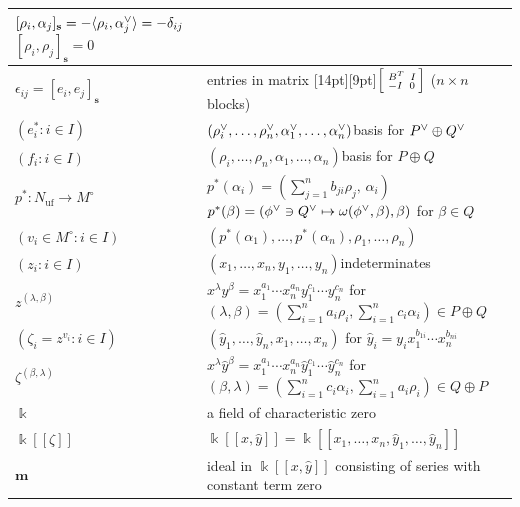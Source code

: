 \documentclass[ALCO,ThmDefs,Unicode,epreuves]{cedram}
\DeclareMathOperator{\uf}{uf}
\newcommand\llbracket{[\![}
\newcommand\rrbracket{]\!]}
\newcommand{\br}[1]{{\langle #1 \rangle}}
\newcommand{\ck}{\spcheck}
\newcommand{\s}{\mathbf{s}}
\newcommand{\m}{\mathbf{m}}
\renewcommand{\k}{\Bbbk}
\newcommand{\hy}{\hat{y}}
\begin{document}
{\begin{longtable}{P{88pt}|P{242pt}}
$[\rho_i,\alpha_j]_\s=-\br{\rho_i,\alpha_j\ck}=-\delta_{ij}$ \newline
$[\rho_i,\rho_j]_\s=0$
\\\hline
$\epsilon_{ij}=[e_i,e_j]_\s$&entries in matrix \raisebox{0pt}[14pt][9pt]{$\begin{bsmallmatrix}\,B^T&\,I\\-I&0\end{bsmallmatrix}$} ($n\times n$ blocks)\\\hline
$(e^*_i:i\in I)$&$(\rho_i\ck,\ldots,\rho_n\ck,\alpha_1\ck,\ldots,\alpha_n\ck)$\quad basis for $P\ck\oplus Q\ck$\\\hline
$(f_i:i\in I)$&$(\rho_i,\ldots,\rho_n,\alpha_1,\ldots,\alpha_n)$\quad basis for $P\oplus Q$\\\hline
$p^*:N_{\uf}\to M^\circ$&$p^*(\alpha_i)=(\sum_{j=1}^nb_{ji}\rho_j,\,\alpha_i)$ %
\newline
$p^*(\beta)=(\phi\ck\ni Q\ck\mapsto\omega(\phi\ck,\beta),\beta)$ for $\beta\in Q$
\\\hline
$(v_i\in M^\circ:i\in I)$&$(p^*(\alpha_1),\ldots,p^*(\alpha_n),\rho_1,\ldots,\rho_n)$\\\hline
$(z_i:i\in I)$&$(x_1,\ldots,x_n,y_1,\ldots,y_n)$\quad indeterminates\\\hline
$z^{(\lambda,\beta)}$&$x^\lambda y^\beta=x_1^{a_1}\cdots x_n^{a_n}y_1^{c_1}\cdots y_n^{c_n}$ for $(\lambda,\beta)=(\sum_{i=1}^na_i\rho_i,\sum_{i=1}^nc_i\alpha_i)\in P\oplus Q$\\\hline
$(\zeta_i=z^{v_i}:i\in I)$&$(\hy_1,\ldots,\hy_n,x_1,\ldots,x_n)$ for $\hy_i=y_ix_1^{b_{1i}}\cdots x_n^{b_{ni}}$\\\hline
$\zeta^{(\beta,\lambda)}$&
$x^\lambda \hy^\beta=x_1^{a_1}\cdots x_n^{a_n}\hy_1^{c_1}\cdots\hy_n^{c_n}$ for $(\beta,\lambda)=(\sum_{i=1}^nc_i\alpha_i,\sum_{i=1}^na_i\rho_i)\in Q\oplus P$\\\hline
$\k$&a field of characteristic zero\\\hline
$\k\llbracket \zeta\rrbracket $&$\k\llbracket x,\hy\rrbracket =\k\llbracket x_1,\ldots,x_n,\hy_1,\ldots,\hy_n\rrbracket $\\\hline
$\m$&ideal in $\k\llbracket x,\hy\rrbracket $ consisting of series with constant term zero\\\hline
\end{longtable}}%
\end{document}
